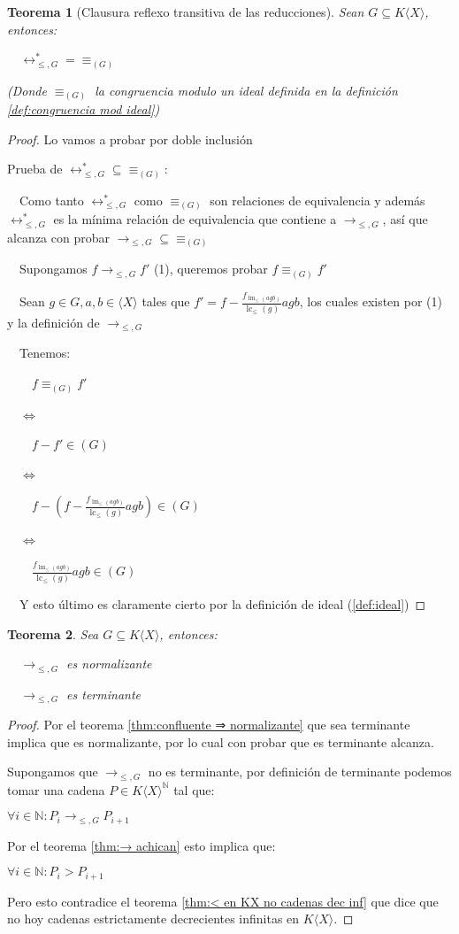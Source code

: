 \documentclass{amsbook}
\theoremstyle{customstyle}
\newtheorem{theorem}{Teorema}[section]
\DeclareMathOperator{\lm}{lm}
\DeclareMathOperator{\lc}{lc}
\begin{document}
\begin{theorem}[Clausura reflexo transitiva de las reducciones]\label{thm:→^* = ≡}
Sean $G ⊆ K⟨X⟩$, entonces:

  $↔^*_{≤, G} = ≡_{(G)}$

(Donde $≡_{(G)}$ la congruencia modulo un ideal definida en la definición \ref{def:congruencia mod ideal})
\end{theorem}
\begin{proof}
Lo vamos a probar por doble inclusión

Prueba de $↔^*_{≤, G} ⊆ ≡_{(G)}$:

  Como tanto $↔^*_{≤, G}$ como $≡_{(G)}$ son relaciones de equivalencia y además $↔^*_{≤, G}$ es la mínima relación de equivalencia que contiene a $→_{≤, G}$, así que alcanza con probar $→_{≤, G} ⊆ ≡_{(G)}$

  Supongamos $f →_{≤, G} f'$ (1), queremos probar $f ≡_{(G)} f'$

  Sean $g ∈ G, a, b ∈ ⟨X⟩$ tales que $f' = f - \frac{f_{\lm_≤(agb)}}{\lc_≤(g)}agb$, los cuales existen por (1) y la definición de $→_{≤, G}$

  Tenemos:

    $f ≡_{(G)} f'$

  $⇔$

    $f - f' ∈ (G)$

  $⇔$

    $f - (f - \frac{f_{\lm_≤(agb)}}{\lc_≤(g)}agb) ∈ (G)$

  $⇔$

    $\frac{f_{\lm_≤(agb)}}{\lc_≤(g)}agb ∈ (G)$

  Y esto último es claramente cierto por la definición de ideal (\ref{def:ideal})

\end{proof}

\begin{theorem}
Sea $G ⊆ K⟨X⟩$, entonces:

  $→_{≤, G}$ es normalizante

  $→_{≤, G}$ es terminante
\end{theorem}
\begin{proof}
Por el teorema \ref{thm:confluente ⇒ normalizante} que sea terminante implica que es normalizante, por lo cual con probar que es terminante alcanza.

Supongamos que $→_{≤, G}$ no es terminante, por definición de terminante podemos tomar una cadena $P ∈ K⟨X⟩^ℕ$ tal que:

$∀i ∈ ℕ : P_i →_{≤, G} P_{i+1}$

Por el teorema \ref{thm:→ achican} esto implica que:

$∀i ∈ ℕ : P_i > P_{i+1}$

Pero esto contradice el teorema \ref{thm:< en KX no cadenas dec inf} que dice que no hoy cadenas estrictamente decrecientes infinitas en $K⟨X⟩$.

\end{proof}
\end{document}
